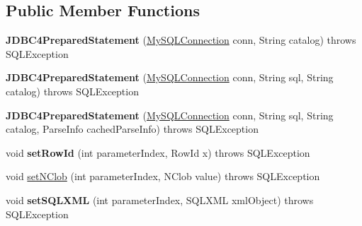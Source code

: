 \subsection*{Public Member Functions}
\begin{DoxyCompactItemize}
\item 
\mbox{\label{classcom_1_1mysql_1_1jdbc_1_1_j_d_b_c4_prepared_statement_a8da5dcdf2732d38a2c85b40cc171c9cd}} 
{\bfseries J\+D\+B\+C4\+Prepared\+Statement} (\mbox{\hyperlink{interfacecom_1_1mysql_1_1jdbc_1_1_my_s_q_l_connection}{My\+S\+Q\+L\+Connection}} conn, String catalog)  throws S\+Q\+L\+Exception 
\item 
\mbox{\label{classcom_1_1mysql_1_1jdbc_1_1_j_d_b_c4_prepared_statement_adb5b8d43736c6afd3701d0577c6c438f}} 
{\bfseries J\+D\+B\+C4\+Prepared\+Statement} (\mbox{\hyperlink{interfacecom_1_1mysql_1_1jdbc_1_1_my_s_q_l_connection}{My\+S\+Q\+L\+Connection}} conn, String sql, String catalog)  throws S\+Q\+L\+Exception 
\item 
\mbox{\label{classcom_1_1mysql_1_1jdbc_1_1_j_d_b_c4_prepared_statement_a68639b7f0d329662bc55a0c823a36560}} 
{\bfseries J\+D\+B\+C4\+Prepared\+Statement} (\mbox{\hyperlink{interfacecom_1_1mysql_1_1jdbc_1_1_my_s_q_l_connection}{My\+S\+Q\+L\+Connection}} conn, String sql, String catalog, Parse\+Info cached\+Parse\+Info)  throws S\+Q\+L\+Exception 
\item 
\mbox{\label{classcom_1_1mysql_1_1jdbc_1_1_j_d_b_c4_prepared_statement_a432496cf9f3405c39621e7940545e4ab}} 
void {\bfseries set\+Row\+Id} (int parameter\+Index, Row\+Id x)  throws S\+Q\+L\+Exception 
\item 
void \mbox{\hyperlink{classcom_1_1mysql_1_1jdbc_1_1_j_d_b_c4_prepared_statement_ad7e3b70ef27aa09c94258bce2851c063}{set\+N\+Clob}} (int parameter\+Index, N\+Clob value)  throws S\+Q\+L\+Exception 
\item 
\mbox{\label{classcom_1_1mysql_1_1jdbc_1_1_j_d_b_c4_prepared_statement_a012626091d8b1561617c42f953b99949}} 
void {\bfseries set\+S\+Q\+L\+X\+ML} (int parameter\+Index, S\+Q\+L\+X\+ML xml\+Object)  throws S\+Q\+L\+Exception 
\end{DoxyCompactItemize}
